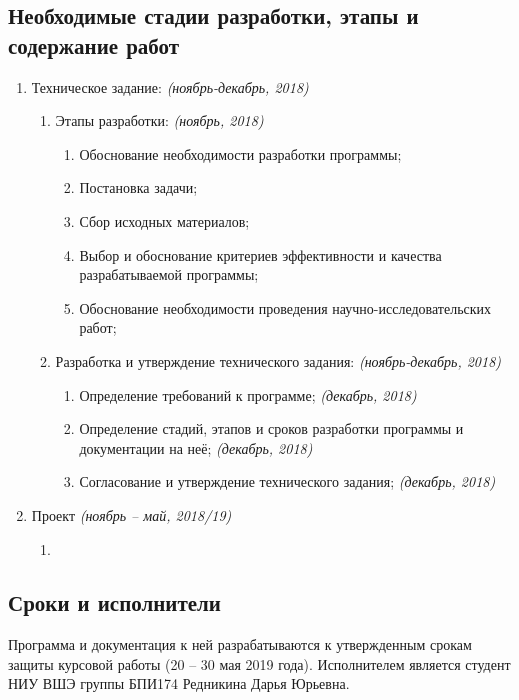 \documentclass[a4paper,12pt,reqno]{article}
\begin{document}
	\subsection{Необходимые стадии разработки, этапы и содержание работ}
	\begin{enumerate}
		\item Техническое задание: \textit{(ноябрь-декабрь, 2018)}
		\begin{enumerate}
			\item Этапы разработки: \textit{(ноябрь, 2018)}
			\begin{enumerate}
				\item Обоснование необходимости разработки программы; 
				\item Постановка задачи; 
				\item Сбор исходных материалов; 
				\item Выбор и обоснование критериев эффективности и качества разрабатываемой программы; 
				\item Обоснование необходимости проведения научно-исследовательских работ; 
			\end{enumerate}
			\item Разработка и утверждение технического задания: \textit{(ноябрь-декабрь, 2018)}
			\begin{enumerate}
				\item Определение требований к программе; \textit{(декабрь, 2018)}
				\item Определение стадий, этапов и сроков разработки программы и документации на неё; \textit{(декабрь, 2018)}
				\item Согласование и утверждение технического задания; \textit{(декабрь, 2018)}
			\end{enumerate}
		\end{enumerate}
		\item Проект \textit{(ноябрь -- май, 2018/19)}
		\begin{enumerate}
			\item 
		\end{enumerate}
	\end{enumerate}
\newpage
	\subsection{Сроки и исполнители}
	Программа и документация к ней разрабатываются к утвержденным срокам защиты курсовой работы (20 – 30 мая 2019 года).
	Исполнителем является студент НИУ ВШЭ группы БПИ174 Редникина Дарья Юрьевна.
	
\end{document}
